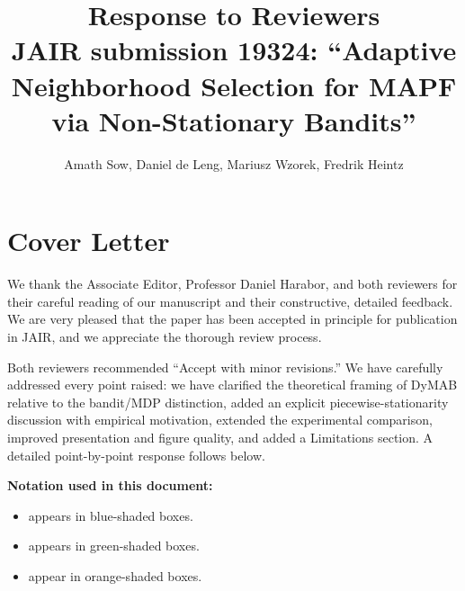 \documentclass[review]{jair}
\begin{document}
\title[Response to Reviewers --- JAIR submission 19324]{Response to Reviewers\\
\large JAIR submission 19324: ``Adaptive Neighborhood Selection for MAPF via Non-Stationary Bandits''}

\author{Amath Sow, Daniel de Leng, Mariusz Wzorek, Fredrik Heintz}

\maketitle

\section*{Cover Letter}

We thank the Associate Editor, Professor Daniel Harabor, and both reviewers for their careful reading of our manuscript and their constructive, detailed feedback. We are very pleased that the paper has been accepted in principle for publication in JAIR, and we appreciate the thorough review process.

Both reviewers recommended ``Accept with minor revisions.'' We have carefully addressed every point raised: we have clarified the theoretical framing of DyMAB relative to the bandit/MDP distinction, added an explicit piecewise-stationarity discussion with empirical motivation, extended the experimental comparison, improved presentation and figure quality, and added a Limitations section. A detailed point-by-point response follows below.

\medskip
\noindent
\textbf{Notation used in this document:}
\begin{itemize}[leftmargin=2em]
  \item {} appears in blue-shaded boxes.
  \item {} appears in green-shaded boxes.
  \item {} appear in orange-shaded boxes.
\end{itemize}
\end{document}
